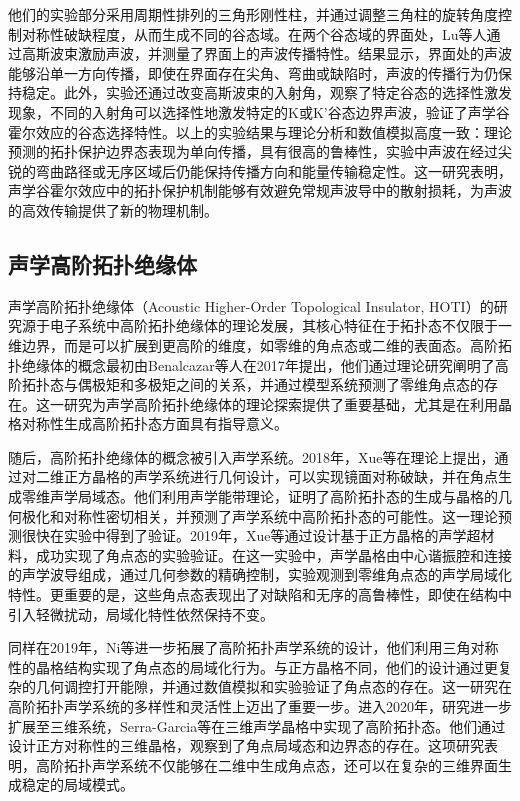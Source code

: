 他们的实验部分采用周期性排列的三角形刚性柱，并通过调整三角柱的旋转角度控制对称性破缺程度，从而生成不同的谷态域。在两个谷态域的界面处，Lu等人通过高斯波束激励声波，并测量了界面上的声波传播特性。结果显示，界面处的声波能够沿单一方向传播，即使在界面存在尖角、弯曲或缺陷时，声波的传播行为仍保持稳定。此外，实验还通过改变高斯波束的入射角，观察了特定谷态的选择性激发现象，不同的入射角可以选择性地激发特定的K或K'谷态边界声波，验证了声学谷霍尔效应的谷态选择特性。以上的实验结果与理论分析和数值模拟高度一致：理论预测的拓扑保护边界态表现为单向传播，具有很高的鲁棒性，实验中声波在经过尖锐的弯曲路径或无序区域后仍能保持传播方向和能量传输稳定性。这一研究表明，声学谷霍尔效应中的拓扑保护机制能够有效避免常规声波导中的散射损耗，为声波的高效传输提供了新的物理机制。

\subsection{声学高阶拓扑绝缘体}

声学高阶拓扑绝缘体（Acoustic Higher-Order Topological Insulator, HOTI）的研究源于电子系统中高阶拓扑绝缘体的理论发展，其核心特征在于拓扑态不仅限于一维边界，而是可以扩展到更高阶的维度，如零维的角点态或二维的表面态。高阶拓扑绝缘体的概念最初由Benalcazar等人在2017年提出，他们通过理论研究阐明了高阶拓扑态与偶极矩和多极矩之间的关系，并通过模型系统预测了零维角点态的存在。这一研究为声学高阶拓扑绝缘体的理论探索提供了重要基础，尤其是在利用晶格对称性生成高阶拓扑态方面具有指导意义。

随后，高阶拓扑绝缘体的概念被引入声学系统。2018年，Xue等在理论上提出，通过对二维正方晶格的声学系统进行几何设计，可以实现镜面对称破缺，并在角点生成零维声学局域态。他们利用声学能带理论，证明了高阶拓扑态的生成与晶格的几何极化和对称性密切相关，并预测了声学系统中高阶拓扑态的可能性。这一理论预测很快在实验中得到了验证。2019年，Xue等通过设计基于正方晶格的声学超材料，成功实现了角点态的实验验证。在这一实验中，声学晶格由中心谐振腔和连接的声学波导组成，通过几何参数的精确控制，实验观测到零维角点态的声学局域化特性。更重要的是，这些角点态表现出了对缺陷和无序的高鲁棒性，即使在结构中引入轻微扰动，局域化特性依然保持不变。

同样在2019年，Ni等进一步拓展了高阶拓扑声学系统的设计，他们利用三角对称性的晶格结构实现了角点态的局域化行为。与正方晶格不同，他们的设计通过更复杂的几何调控打开能隙，并通过数值模拟和实验验证了角点态的存在。这一研究在高阶拓扑声学系统的多样性和灵活性上迈出了重要一步。进入2020年，研究进一步扩展至三维系统，Serra-Garcia等在三维声学晶格中实现了高阶拓扑态。他们通过设计正方对称性的三维晶格，观察到了角点局域态和边界态的存在。这项研究表明，高阶拓扑声学系统不仅能够在二维中生成角点态，还可以在复杂的三维界面生成稳定的局域模式。

